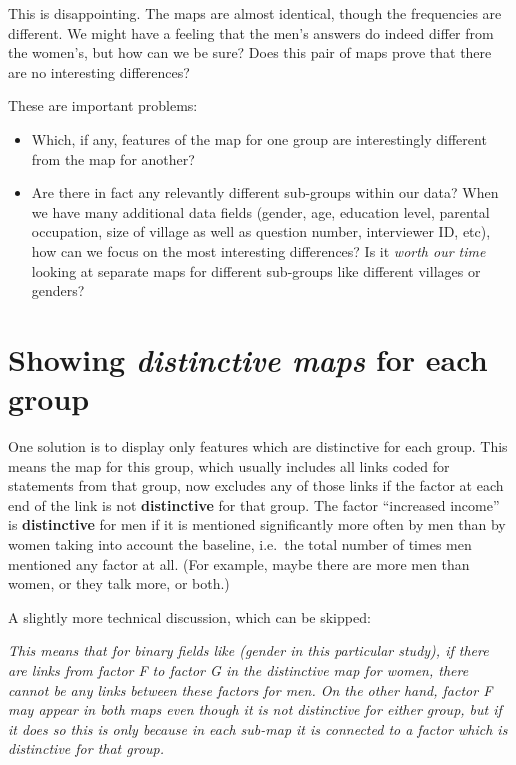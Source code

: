 \documentclass[
]{book}
\begin{document}
This is disappointing. The maps are almost identical, though the frequencies are different. We might have a feeling that the men's answers do indeed differ from the women's, but how can we be sure? Does this pair of maps prove that there are no interesting differences?

These are important problems:

\begin{itemize}
\item
  Which, if any, features of the map for one group are interestingly different from the map for another?
\item
  Are there in fact any relevantly different sub-groups within our data? When we have many additional data fields (gender, age, education level, parental occupation, size of village as well as question number, interviewer ID, etc), how can we focus on the most interesting differences? Is it \emph{worth our time} looking at separate maps for different sub-groups like different villages or genders?
\end{itemize}

\hypertarget{showing-distinctive-maps-for-each-group}{%
\section{\texorpdfstring{Showing \emph{distinctive maps} for each group}{Showing distinctive maps for each group}}\label{showing-distinctive-maps-for-each-group}}

One solution is to display only features which are distinctive for each group. This means the map for this group, which usually includes all links coded for statements from that group, now excludes any of those links if the factor at each end of the link is not \textbf{distinctive} for that group. The factor ``increased income'' is \textbf{distinctive} for men if it is mentioned significantly more often by men than by women taking into account the baseline, i.e.~the total number of times men mentioned any factor at all. (For example, maybe there are more men than women, or they talk more, or both.)

A slightly more technical discussion, which can be skipped:

\emph{This means that for binary fields like (gender in this particular study), if there are links from factor F to factor G in the distinctive map for women, there cannot be any links between these factors for men. On the other hand, factor F may appear in both maps even though it is not distinctive for either group, but if it does so this is only because in each sub-map it is connected to a factor which is distinctive for that group.}
\end{document}
